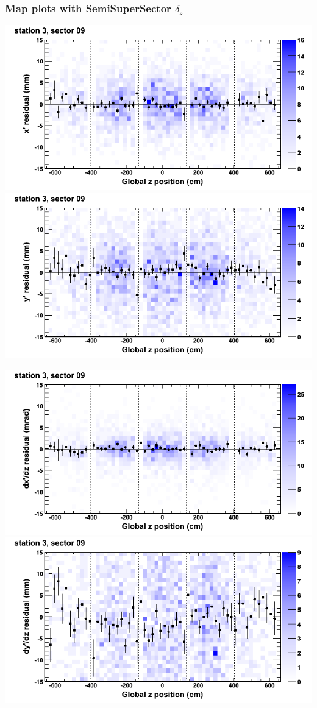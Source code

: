 \documentclass[compress]{beamer}
\begin{document}
\begin{frame}
\frametitle{Map plots with SemiSuperSector $\delta_z$}
\includegraphics[width=0.5\linewidth]{zfit_mapplots/DTvsz_st3sec09_x.png}
\includegraphics[width=0.5\linewidth]{zfit_mapplots/DTvsz_st3sec09_y.png}

\includegraphics[width=0.5\linewidth]{zfit_mapplots/DTvsz_st3sec09_dxdz.png}
\includegraphics[width=0.5\linewidth]{zfit_mapplots/DTvsz_st3sec09_dydz.png}
\end{frame}
\end{document}
